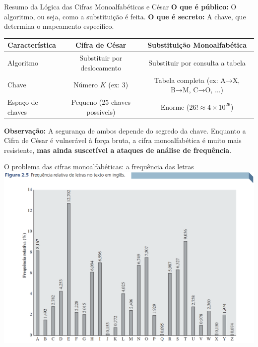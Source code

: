 \begin{frame}{Resumo da Lógica das Cifras Monoalfabéticas e César}
\textbf{O que é público:} O algoritmo, ou seja, como a substituição é feita.  
\textbf{O que é secreto:} A chave, que determina o mapeamento específico.

\medskip
\small
\begin{tabular}{l|c|c}
\textbf{Característica} & \textbf{Cifra de César} & \textbf{Substituição Monoalfabética} \\
\hline
Algoritmo & Substituir por deslocamento & Substituir por consulta a tabela \\
Chave & Número $K$ (ex: 3) & Tabela completa (ex: A→X, B→M, C→O, ...) \\
Espaço de chaves & Pequeno (25 chaves possíveis) & Enorme ($26! \approx 4 \times 10^{26}$) \\
\end{tabular}

\medskip
\textbf{Observação:}  
A segurança de ambos depende do segredo da chave. Enquanto a Cifra de César é vulnerável à força bruta, a cifra monoalfabética é muito mais resistente, \textbf{mas ainda suscetível a ataques de análise de frequência}.
\end{frame}


\begin{frame}{O problema das cifras monoalfabéticas: a frequência das letras}
    \centering
    \includegraphics[width=0.8\linewidth]{Figuras/frequencia-letras-ingles.png}


\end{frame}

